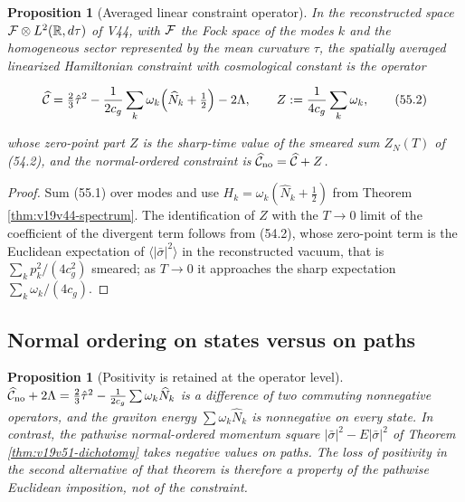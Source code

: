 \documentclass[11pt]{article}
\newtheorem{proposition}[theorem]{Proposition}
\theoremstyle{remark}
\begin{document}
\begin{proposition}[Averaged linear constraint operator]
\label{prop:v19v52-operator}
In the reconstructed space \({\cal F}\otimes L^2(\mathbb R,d\tau)\) of
V44, with \({\cal F}\) the Fock space of the modes \(k\) and the
homogeneous sector represented by the mean curvature \(\tau\), the
spatially averaged linearized Hamiltonian constraint with cosmological
constant is the operator

\[
 \widehat{\cal C}
 =\tfrac23\hat\tau^2-\frac1{2c_g}\sum_k\omega_k\Bigl(\widehat N_k+\tfrac12\Bigr)-2\Lambda,
 \qquad
 Z:=\frac1{4c_g}\sum_k\omega_k,                                       \tag{55.2}
\]

whose zero-point part \(Z\) is the sharp-time value of the smeared
sum \(Z_N(T)\) of (54.2), and the normal-ordered constraint is
\(\widehat{\cal C}_{\rm no}=\widehat{\cal C}+Z\).
\end{proposition}

\begin{proof}
Sum (55.1) over modes and use \(H_k=\omega_k(\widehat N_k+\tfrac12)\)
from Theorem \ref{thm:v19v44-spectrum}.  The identification of \(Z\)
with the \(T\to0\) limit of the coefficient of the divergent term
follows from (54.2), whose zero-point term is the Euclidean expectation
of \(\langle|\bar\sigma|^2\rangle\) in the reconstructed vacuum, that
is \(\sum_kp_k^2/(4c_g^2)\) smeared; as \(T\to0\) it approaches the
sharp expectation \(\sum_k\omega_k/(4c_g)\).
\end{proof}

\subsection{Normal ordering on states versus on paths}

\begin{proposition}[Positivity is retained at the operator level]
\label{prop:v19v52-positivity}
\(\widehat{\cal C}_{\rm no}+2\Lambda=\tfrac23\hat\tau^2-\tfrac1{2c_g}\sum\omega_k\widehat N_k\)
is a difference of two commuting nonnegative operators, and the
graviton energy \(\sum\omega_k\widehat N_k\) is nonnegative on every
state.  In contrast, the pathwise normal-ordered momentum square
\(|\bar\sigma|^2-E|\bar\sigma|^2\) of Theorem \ref{thm:v19v51-dichotomy}
takes negative values on paths.  The loss of positivity in the second
alternative of that theorem is therefore a property of the pathwise
Euclidean imposition, not of the constraint.
\end{proposition}
\end{document}
